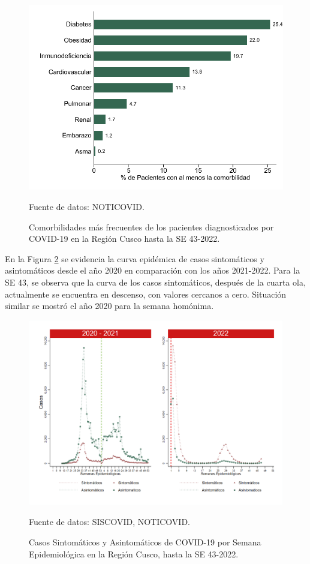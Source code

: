 \documentclass[12pt,a4paper,openany]{book}
\begin{document}
	
	  
	\begin{figure}[h]
				\caption{Comorbilidades más frecuentes de los pacientes diagnosticados por COVID-19 en la Región Cusco hasta la SE 43-2022. }\label{fig:comorbilidades}
		\begin{center}
			\includegraphics[width=0.65\linewidth]{../figuras/figura_comorbilidad.pdf}
		\end{center}
		{\footnotesize {Fuente de datos: NOTICOVID.}}
	\end{figure}
	\clearpage
	En la Figura \ref{fig:sintomaticos_asintomati} se evidencia la curva epidémica de casos sintomáticos y asintomáticos desde el año 2020 en comparación con los años 2021-2022. Para la SE 43, se observa que la curva de los casos sintomáticos, después de la cuarta ola, actualmente se encuentra en descenso, con valores cercanos a cero. Situación similar se mostró el año 2020 para la semana homónima.
	
	\begin{figure}[h]
		\caption{Casos Sintomáticos y Asintomáticos de COVID-19 por Semana Epidemiológica en la Región Cusco, hasta la SE 43-2022.  }\label{fig:sintomaticos_asintomati}
		
		\begin{center}
			\includegraphics[width=0.95\linewidth]{../figuras/sintomaticos_20_21_22.png}
		\end{center}
		{\footnotesize {Fuente de datos: SISCOVID, NOTICOVID.}}
	\end{figure}
	\clearpage
	
\end{document}
